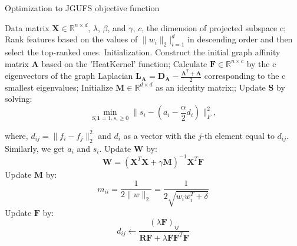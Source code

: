 \documentclass[a0paper,portrait]{baposter}
\begin{document}
\begin{poster}
{\begin{algorithm}[H]
  \renewcommand{\algorithmicrequire}{\textbf{Input:}}
  \renewcommand{\algorithmicensure}{\textbf{Output:}}
  \caption{Optimization to JGUFS objective function}
    \begin{algorithmic}[1]
    \REQUIRE Data matrix $\mathbf{X}\in\mathbb{R}^{n\times d}$, $\lambda$, $\beta$, and $\gamma$, $c$, the dimension of projected subspace c;
    \ENSURE Rank features based on the values of $\|w_i\|_2|_{i=1}^d$ in descending order and then select the top-ranked ones.
    \STATE Initialization. Construct the initial graph affinity matrix $\mathbf{A}$ based on the 'HeatKernel' function; Calculate $\mathbf{F}\in\mathbb{R}^{n\times c}$ by the c eigenvectors of the graph Laplacian $\mathbf{L_A}=\mathbf{D_A}-\frac{\mathbf{A}^T+\mathbf{A}}{2}$ corresponding to the c smallest eigenvalues; Initialize $\mathbf{M}\in\mathbb{R}^{d\times d}$ as an identity matrix;;
    \STATE Update $\mathbf{S}$ by solving:
    \vspace{-10pt}
    \begin{equation}\nonumber
        \min_{S_i\mathbf{1}=1,s_i\ge0}\|s_i-(a_i-\frac{\alpha}{2}d_i)\|_F^2,
    \end{equation}
    
    where, $d_{ij}=\|f_i-f_j\|_2^2$ and $d_i$ as a vector with the $j$-th element equal to $d_{ij}$. Similarly, we get $a_i$ and $s_i$.
    \STATE Update $\mathbf{W}$ by:
    \vspace{-7pt}
    \begin{equation}\nonumber
       \mathbf{W}=(\mathbf{X}^T\mathbf{X}+\gamma\mathbf{M})^{-1}\mathbf{X}^T\mathbf{F}
    \end{equation}
    \vspace{-15pt}
    \STATE Update $\mathbf{M}$ by:
    \vspace{-7pt}
    \begin{equation}\nonumber
        m_{ii}=\frac{1}{2\|w\|_2}=\frac{1}{2\sqrt{w_iw_i^T+\delta}}
    \end{equation}
    \vspace{-10pt}
    \STATE Update $\mathbf{F}$ by:
    \vspace{-10pt}
    \begin{equation}\nonumber
        d_{ij} \leftarrow \frac{(\lambda \mathbf{F})_{ij}}{\mathbf{R}\mathbf{F}+\lambda\mathbf{FF}^T\mathbf{F}}
    \end{equation}
    \vspace{-15pt}
    \ENDWHILE
    \end{algorithmic}
    \label{alg:1}
\end{algorithm}

}
\end{poster}
\end{document}
